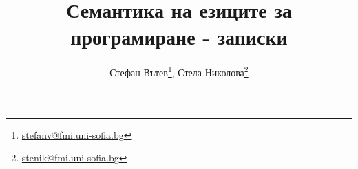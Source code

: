 \documentclass[a4paper,11pt,oneside]{book}
\theoremstyle{definition}
\begin{document}
\author{Стефан Вътев\footnote{\href{mailto:stefanv@fmi.uni-sofia.bg}{stefanv@fmi.uni-sofia.bg}}, Стела Николова\footnote{\href{mailto:stenik@fmi.uni-sofia.bg}{stenik@fmi.uni-sofia.bg}}}
\title{Семантика на езиците за програмиране - записки}


\maketitle
\tableofcontents








% 
% 
% 




% 

% 
% 
% 
% 
%
% 

% 




\printindex
\end{document}
